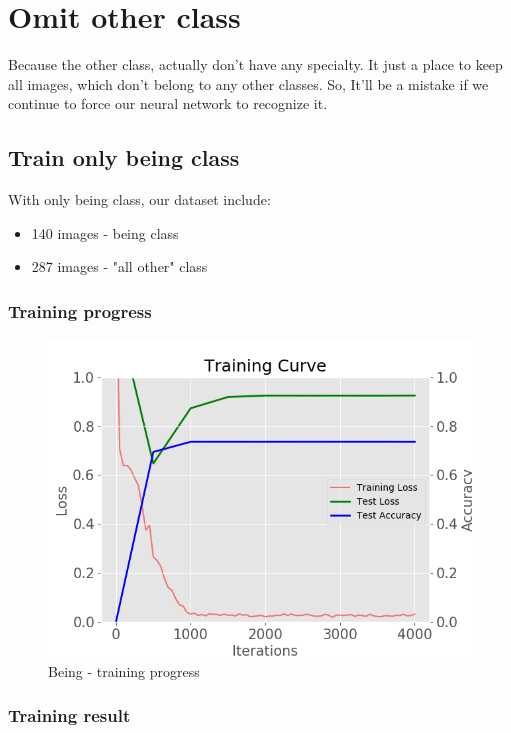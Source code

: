 \documentclass[11pt]{article}
\begin{document}
\section{Omit other class}
Because the other class, actually don't have any specialty. It just a place to keep all images, which don't belong to any other classes. So, It'll be a mistake if we continue to force our neural network to recognize it. 

\subsection{Train only being class}
With only being class, our dataset include: 
\begin{itemize}
\item 140 images - being class
\item 287 images - "all other" class
\end{itemize}

\subsubsection{Training progress}

\begin{figure}[H]
\centering
\includegraphics[width=1\textwidth]{images/train_omit_other_only_being}
\caption{Being - training progress}
\end{figure}

\subsubsection{Training result}
\end{document}
